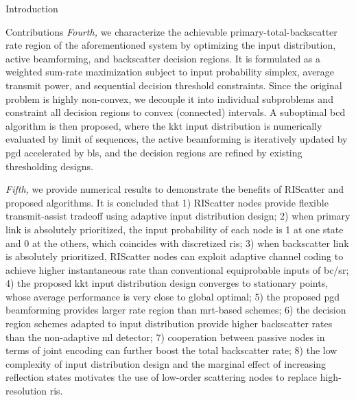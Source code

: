 \documentclass[journal]{IEEEtran}
\begin{document}
\begin{section}{Introduction}
\begin{subsection}{Contributions}
		\emph{Fourth,} we characterize the achievable primary-total-backscatter rate region of the aforementioned system by optimizing the input distribution, active beamforming, and backscatter decision regions.
		It is formulated as a weighted sum-rate maximization subject to input probability simplex, average transmit power, and sequential decision threshold constraints.
		Since the original problem is highly non-convex, we decouple it into individual subproblems and constraint all decision regions to convex (connected) intervals.
		A suboptimal \gls{bcd} algorithm is then proposed, where the \gls{kkt} input distribution is numerically evaluated by limit of sequences, the active beamforming is iteratively updated by \gls{pgd} accelerated by \gls{bls}, and the decision regions are refined by existing thresholding designs.

		\emph{Fifth,} we provide numerical results to demonstrate the benefits of RIScatter and proposed algorithms.
		It is concluded that
		1) RIScatter nodes provide flexible transmit-assist tradeoff using adaptive input distribution design;
		2) when primary link is absolutely prioritized, the input probability of each node is \num{1} at one state and \num{0} at the others, which coincides with discretized \gls{ris};
		3) when backscatter link is absolutely prioritized, RIScatter nodes can exploit adaptive channel coding to achieve higher instantaneous rate than conventional equiprobable inputs of \gls{bc}/\gls{sr};
		4) the proposed \gls{kkt} input distribution design converges to stationary points, whose average performance is very close to global optimal;
		5) the proposed \gls{pgd} beamforming provides larger rate region than \gls{mrt}-based schemes;
		6) the decision region schemes adapted to input distribution provide higher backscatter rates than the non-adaptive \gls{ml} detector;
		7) cooperation between passive nodes in terms of joint encoding can further boost the total backscatter rate;
		8) the low complexity of input distribution design and the marginal effect of increasing reflection states motivates the use of low-order scattering nodes to replace high-resolution \gls{ris}.
	\end{subsection}


\end{section}
\end{document}
